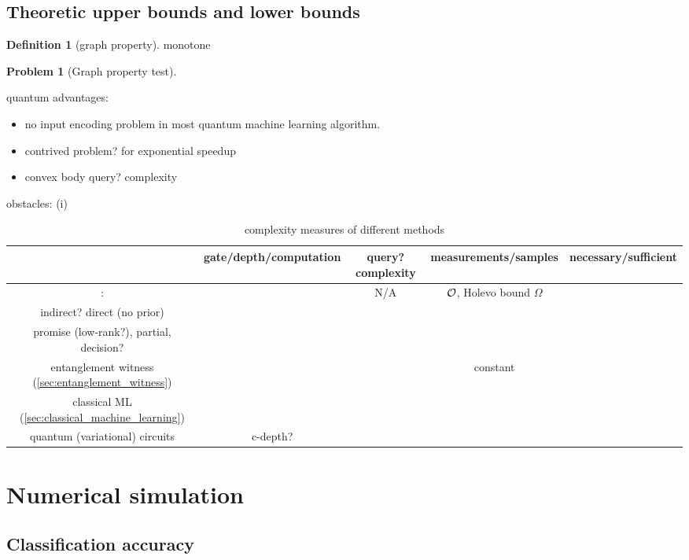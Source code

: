 \documentclass[
aps,
pra,
linenumbers,
floatfix,
]{revtex4-2}
\theoremstyle{plain}
\theoremstyle{definition}
\newtheorem{definition}{Definition}
\newtheorem{problem}{Problem}
\begin{document}
\subsection{Theoretic upper bounds and lower bounds}
\cite{huangPowerDataQuantum2021}
\cite{huangPredictingManyProperties2020}
\cite{aaronsonShadowTomographyQuantum2018}
\cite{huangInformationtheoreticBoundsQuantum2021}
\cite{liuRigorousRobustQuantum2021}
\begin{definition}[graph property]\label{def:graph_property}
	monotone
\end{definition}
\begin{problem}[Graph property test]
\end{problem}
quantum advantages:
\begin{itemize}
	\item no input encoding problem \cite{tangQuantumPrincipalComponent2021} in most quantum machine learning algorithm.
	\item contrived problem? for exponential speedup
	\item convex body query? complexity
\end{itemize}
obstacles: (i)
\begin{table}[!ht]
\centering
\begin{tabular}{c|c|c|c|c}
	& gate/depth/computation & query?complexity & measurements/samples & necessary/sufficient \\  
	\hline
	\nameref{prm:shadow_tomography}:  & & N/A & $\mathcal{O}$, Holevo bound $\Omega$ & \\  
	indirect? direct (no prior) & & & & \\  
	promise (low-rank?), partial, decision? & & & & \\  
	entanglement witness (\cref{sec:entanglement_witness}) & & & constant & \\  
	classical ML (\cref{sec:classical_machine_learning})  & & & & \\  
	quantum (variational) circuits & c-depth? & & & \\  
	\hline
\end{tabular}
\caption{complexity measures of different methods}
\end{table}

\section{Numerical simulation}
\subsection{Classification accuracy}
\end{document}
